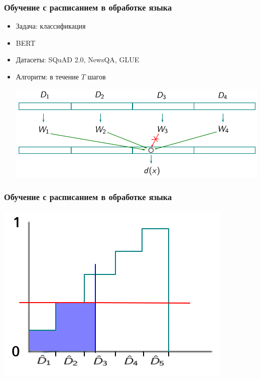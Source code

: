 \documentclass{beamer}
\begin{document}
\begin{frame}
	\frametitle{Обучение с расписанием в обработке языка}		\let\thefootnote\relax{}
	\begin{itemize}
		\item Задача: классификация
		\item BERT
		\item Датасеты: SQuAD 2.0, NewsQA, GLUE
		\item Алгоритм: в течение $T$ шагов
			\begin{center}
				\includegraphics[scale=0.45]{acl20_algo_difficulty}
			\end{center}
	\end{itemize}
\end{frame}

\begin{frame}
	\frametitle{Обучение с расписанием в обработке языка}
	\begin{center}
		\includegraphics[scale=0.6]{acl20_algo_sampler}
	\end{center}
\end{frame}
\end{document}
